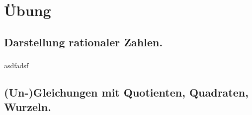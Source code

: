 \documentclass[headsepline,headings=onelinechapter,chapterprefix=false]{scrreprt}
\begin{document}
\chapter{Übung}
\section{Darstellung rationaler Zahlen.}
\subsection{}
asdfadsf
\section{(Un-)Gleichungen mit Quotienten, Quadraten, Wurzeln.}
\end{document}
